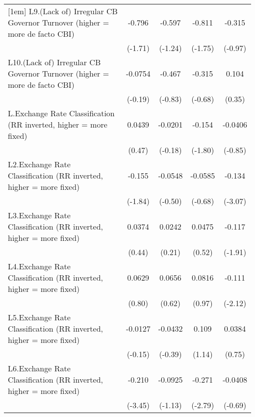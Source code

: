 {\begin{longtable}{l*{4}{c}}
[1em]
L9.(Lack of) Irregular CB Governor Turnover (higher = more de facto CBI)&   -0.796         &   -0.597         &   -0.811         &   -0.315         \\
                &  (-1.71)         &  (-1.24)         &  (-1.75)         &  (-0.97)         \\
[1em]
L10.(Lack of) Irregular CB Governor Turnover (higher = more de facto CBI)&  -0.0754         &   -0.467         &   -0.315         &    0.104         \\
                &  (-0.19)         &  (-0.83)         &  (-0.68)         &   (0.35)         \\
[1em]
L.Exchange Rate Classification (RR inverted, higher = more fixed)&   0.0439         &  -0.0201         &   -0.154         &  -0.0406         \\
                &   (0.47)         &  (-0.18)         &  (-1.80)         &  (-0.85)         \\
[1em]
L2.Exchange Rate Classification (RR inverted, higher = more fixed)&   -0.155         &  -0.0548         &  -0.0585         &   -0.134\sym{**} \\
                &  (-1.84)         &  (-0.50)         &  (-0.68)         &  (-3.07)         \\
[1em]
L3.Exchange Rate Classification (RR inverted, higher = more fixed)&   0.0374         &   0.0242         &   0.0475         &   -0.117         \\
                &   (0.44)         &   (0.21)         &   (0.52)         &  (-1.91)         \\
[1em]
L4.Exchange Rate Classification (RR inverted, higher = more fixed)&   0.0629         &   0.0656         &   0.0816         &   -0.111\sym{*}  \\
                &   (0.80)         &   (0.62)         &   (0.97)         &  (-2.12)         \\
[1em]
L5.Exchange Rate Classification (RR inverted, higher = more fixed)&  -0.0127         &  -0.0432         &    0.109         &   0.0384         \\
                &  (-0.15)         &  (-0.39)         &   (1.14)         &   (0.75)         \\
[1em]
L6.Exchange Rate Classification (RR inverted, higher = more fixed)&   -0.210\sym{***}&  -0.0925         &   -0.271\sym{**} &  -0.0408         \\
                &  (-3.45)         &  (-1.13)         &  (-2.79)         &  (-0.69)         \\

\end{longtable}}
